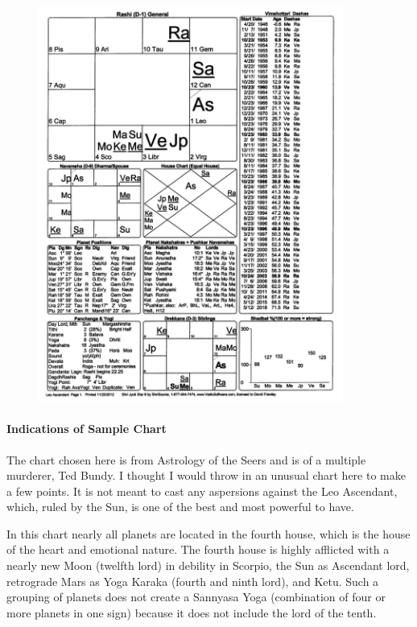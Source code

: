 \begin{figure}[h]
\centering
\includegraphics[width=10cm]{pics/Leo-Ascendant.jpg}
\caption{}
\end{figure}
 

 

\paragraph{Indications of Sample Chart}

 

The chart chosen here is from Astrology of the Seers and is of a multiple murderer, Ted Bundy. I thought I would throw in an unusual chart here to make a few points. It is not meant to cast any aspersions against the Leo Ascendant, which, ruled by the Sun, is one of the best and most powerful to have.

 

In this chart nearly all planets are located in the fourth house, which is the house of the heart and emotional nature. The fourth house is highly afflicted with a nearly new Moon (twelfth lord) in debility in Scorpio, the Sun as Ascendant lord, retrograde Mars as Yoga Karaka (fourth and ninth lord), and Ketu. Such a grouping of planets does not create a Sannyasa Yoga (combination of four or more planets in one sign) because it does not include the lord of the tenth.

